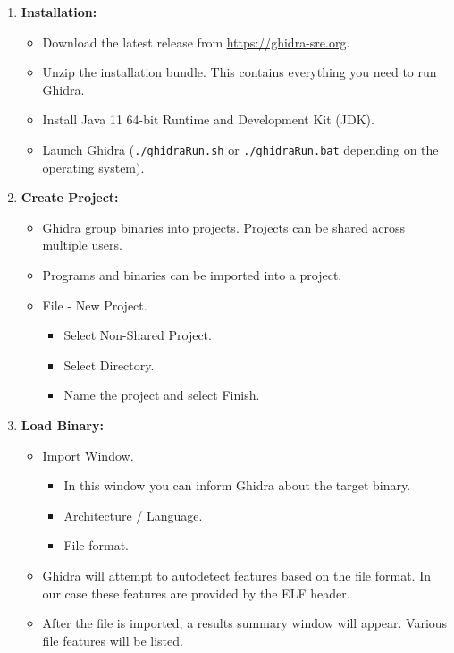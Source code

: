 \documentclass{article}
\begin{document}
\begin{enumerate}
\item{\textbf{Installation:}}
    \begin{itemize}
    \item Download the latest release from \url{https://ghidra-sre.org}.
    \item Unzip the installation bundle. This contains everything you need to run Ghidra.
    \item Install Java 11 64-bit Runtime and Development Kit (JDK).
    \item Launch Ghidra (\texttt{./ghidraRun.sh} or \texttt{./ghidraRun.bat} depending on the operating system).
    \end{itemize}
\item{\textbf{Create Project:}}
    \begin{itemize}
    \item Ghidra group binaries into projects. Projects can be shared across multiple users.
    \item Programs and binaries can be imported into a project.
    \item File - New Project.
        \begin{itemize}
        \item Select Non-Shared Project.
        \item Select Directory.
        \item Name the project and select Finish.
        \end{itemize}
    \end{itemize}
\item{\textbf{Load Binary:}}
    \begin{itemize}
    \item Import Window.
        \begin{itemize}
        \item In this window you can inform Ghidra about the target binary.
        \item Architecture / Language.
        \item File format.
        \end{itemize}
    \item Ghidra will attempt to autodetect features based on the file format. In our case these features are
          provided by the ELF header.
    \item After the file is imported, a results summary window will appear. Various file features will be listed.
    \end{itemize}
\end{enumerate}
\end{document}
